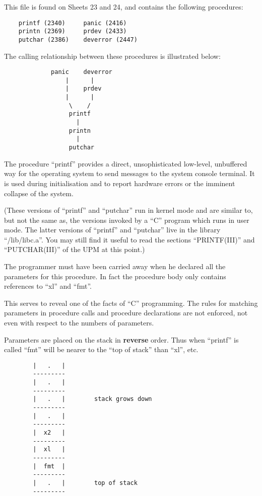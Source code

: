 This file is found on Sheets 23 and 24,
and contains the following procedures:

\begin{verbatim}
    printf (2340)     panic (2416)
    printn (2369)     prdev (2433)
    putchar (2386)    deverror (2447)
\end{verbatim}

The calling relationship between these
procedures is illustrated below:

\newpage
\begin{verbatim}
             panic    deverror
                 |      |
                 |    prdev
                 |      |
                  \    /
                  printf
                    |
                  printn
                    |
                  putchar
\end{verbatim}


The procedure ``printf'' provides a
direct, unsophisticated low-level,
unbuffered way for the operating system
to send messages to the system console
terminal. It is used during initialisation and to report hardware errors or
the imminent collapse of the system.


(These versions of ``printf'' and
``putchar'' run in kernel mode and are
similar to, but not the same as, the
versions invoked by a ``C'' program which
runs in user mode. The latter versions
of ``printf'' and ``putchar'' live in the
library ``/lib/libc.a''. You may still
find it useful to read the sections
``PRINTF(III)'' and ``PUTCHAR(III)'' of the
UPM at this point.)


\bd
\item[2340:] The programmer must have been
 carried away when he declared all
 the parameters for this procedure. In fact the procedure
 body only contains references to
 ``xl'' and ``fmt''.
\ed


This serves to reveal one of the facts
of ``C'' programming. The rules for
matching parameters in procedure calls
and procedure declarations are not
enforced, not even with respect to the
numbers of parameters.

Parameters are placed on the stack in
{\bf reverse} order. Thus when ``printf'' is
called ``fmt'' will be nearer to the ``top
of stack'' than ``xl'', etc.

\begin{verbatim}
        |   .   |
        ---------
        |   .   |
        ---------
        |   .   |        stack grows down
        ---------
        |   .   |
        ---------
        |  x2   |
        ---------
        |  xl   |
        ---------
        |  fmt  |
        ---------
        |   .   |        top of stack
        ---------
\end{verbatim}

